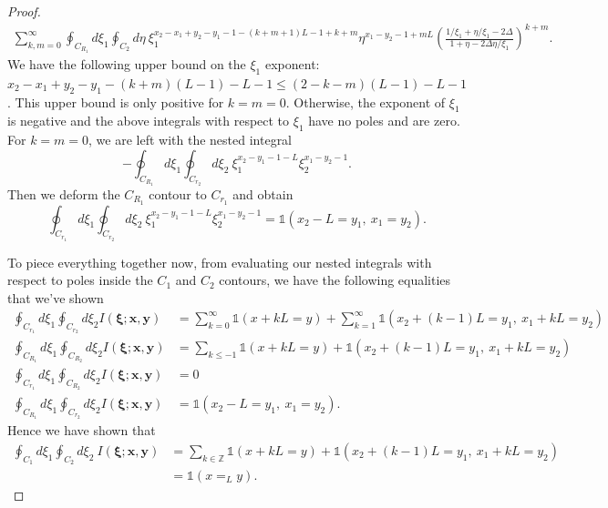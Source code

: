 \documentclass[a4paper,11pt]{article}
\theoremstyle{definition}
\begin{document}
\begin{proof}
\begin{equation}
\begin{split}
    \sum_{k,m=0}^{\infty}\oint_{C_{R_1}}d\xi_1\oint_{C_{2}}d\eta \ \xi_1^{x_2-x_1+y_2-y_1-1-(k+m+1)L - 1 + k + m}\eta^{x_1-y_2-1+mL}\left(\frac{1/\xi_1+\eta/\xi_1-2\Delta}{1+\eta-2\Delta \eta/\xi_1} \right)^{k+m}.
    \end{split}
\end{equation}
 We have the following upper bound on the $\xi_1$ exponent: 
 $x_2-x_1+y_2-y_1-(k+m)(L-1)-L-1
 \leq (2-k-m)(L-1)-L-1$.
 This upper bound is only positive for $k=m=0$. Otherwise, the exponent of $\xi_1$ is negative and the above integrals with respect to $\xi_1$ have no poles and are zero. For $k=m=0$, we are left with the nested integral 
 \begin{equation}
     -\oint_{C_{R_1}}d\xi_1\oint_{C_{r_2}}d\xi_2 \ \xi_1^{x_2-y_1-1-L}\xi_2^{x_1-y_2-1}.
 \end{equation}
 Then we deform the $C_{R_1}$ contour to $C_{r_1}$ and obtain 
\begin{equation}
    \oint_{C_{r_1}}d\xi_1\oint_{C_{r_2}}d\xi_2 \ \xi_1^{x_2-y_1-1-L}\xi_2^{x_1-y_2-1} = \mathds{1}(x_2-L=y_1, \ x_1=y_2).
\end{equation}

To piece everything together now, from evaluating our nested integrals with respect to poles inside the $C_1$ and $C_2$ contours, we have the following equalities that we've shown 
\begin{equation}
    \begin{split}
        \oint_{C_{r_1}}d\xi_1\oint_{C_{r_2}}d\xi_2 I(\boldsymbol{\xi};\mathbf{x},\mathbf{y}) &= \sum_{k=0}^\infty \mathds{1}(x+kL=y) + \sum_{k=1}^\infty\mathds{1}(x_2+(k-1)L=y_1,\ x_1+kL=y_2) \\
        \oint_{C_{R_1}}d\xi_1\oint_{C_{R_2}}d\xi_2 I(\boldsymbol{\xi};\mathbf{x},\mathbf{y}) &= \sum_{k\leq -1} \mathds{1}(x+kL=y) + \mathds{1}(x_2+(k-1)L=y_1,\ x_1+kL=y_2) \\
        \oint_{C_{r_1}}d\xi_1\oint_{C_{R_2}}d\xi_2 I(\boldsymbol{\xi};\mathbf{x},\mathbf{y}) &= 0 \\
        \oint_{C_{R_1}}d\xi_1\oint_{C_{r_2}}d\xi_2 I(\boldsymbol{\xi};\mathbf{x},\mathbf{y}) &= \mathds{1}(x_2-L=y_1,\ x_1=y_2).
    \end{split}
\end{equation}
Hence we have shown that 
\begin{equation}
\begin{split}
    \oint_{C_1}d\xi_1\oint_{C_2}d\xi_2 \ I(\boldsymbol{\xi};\mathbf{x},\mathbf{y}) &= \sum_{k\in\mathbb{Z}}\mathds{1}(x+kL=y) + \mathds{1}(x_2+(k-1)L=y_1,\ x_1+kL=y_2)\\
    &= \mathds{1}(x=_L y).
\end{split}
\end{equation}
\end{proof}
\end{document}
